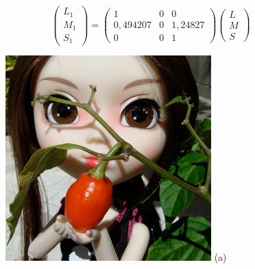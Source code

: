 \documentclass[	12pt, Times, openright, twoside, a4paper, english, brazil]{abntex2}
\begin{document}
\begin{equation}
\left(\begin{array}{ccc}
L_1\\M_1\\S_1
\end{array}\right)
=
\left(\begin{array}{ccc}
1 & 0 & 0 \\
0,494207 & 0 & 1,24827 \\
0 & 0 & 1
\end{array}\right)
\left(\begin{array}{ccc}
L\\M\\S
\end{array}\right)
\label{eq:simulaDeut}
\end{equation}

\begin{figure}[!htb]
\centering
{\includegraphics[width=\linewidth]{figuraSimuladorOriginal.png}}
(a)
\endminipage\hfill
{}
\centering

\end{figure}
\end{document}
